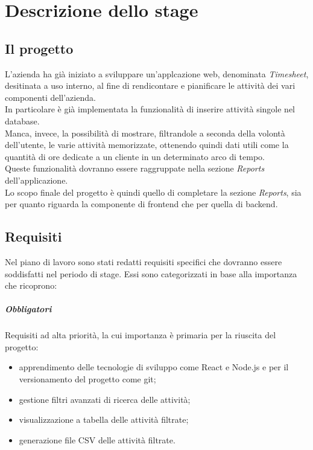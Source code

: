 
\chapter{Descrizione dello stage}
\label{cap:descrizionestage}

\section{Il progetto}

L'azienda ha già iniziato a sviluppare un'applcazione web, denominata \emph{Timesheet}, desitinata a uso interno, al fine di rendicontare e pianificare le attività dei vari componenti dell'azienda. \\
In particolare è già implementata la funzionalità di inserire attività singole nel database. \\
Manca, invece, la possibilità di mostrare, filtrandole a seconda della volontà dell'utente, le varie attività memorizzate, ottenendo quindi dati utili come la quantità di ore dedicate a un cliente in un determinato arco di tempo. \\
Queste funzionalità dovranno essere raggruppate nella sezione \emph{Reports} dell'applicazione. \\
Lo scopo finale del progetto è quindi quello di completare la sezione \emph{Reports}, sia per quanto riguarda la componente di frontend che per quella di backend.

\section{Requisiti}

Nel piano di lavoro sono stati redatti requisiti specifici che dovranno essere soddisfatti nel periodo di stage. Essi sono categorizzati in base alla importanza che ricoprono:


\paragraph{Obbligatori} Requisiti ad alta priorità, la cui importanza è primaria per la riuscita del progetto:

\begin{itemize}
  \item apprendimento delle tecnologie di sviluppo come React e Node.js e per il versionamento del progetto come git;
  \item gestione filtri avanzati di ricerca delle attività;
  \item visualizzazione a tabella delle attività filtrate;
  \item generazione file CSV delle attività filtrate.
\end{itemize}

